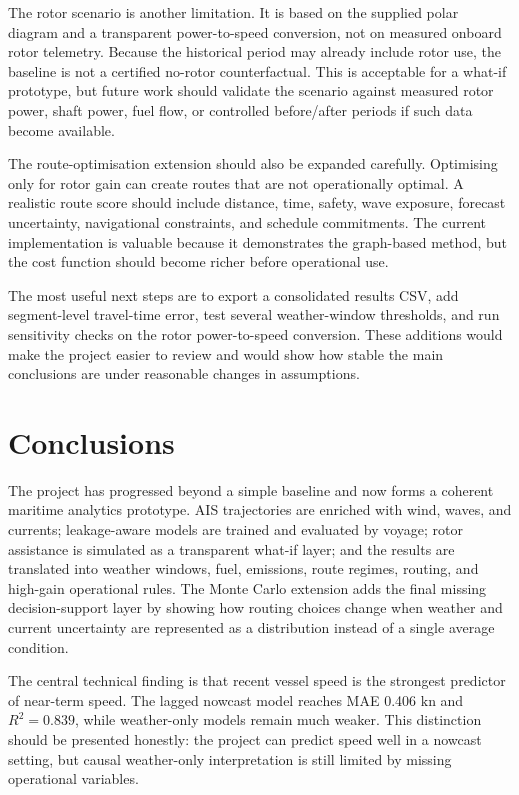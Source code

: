 \documentclass[10pt,a4paper]{article}
\newcommand{\kn}{\ensuremath{\mathrm{kn}}}
\begin{document}
The rotor scenario is another limitation. It is based on the supplied polar
diagram and a transparent power-to-speed conversion, not on measured onboard
rotor telemetry. Because the historical period may already include rotor use,
the baseline is not a certified no-rotor counterfactual. This is acceptable for
a what-if prototype, but future work should validate the scenario against
measured rotor power, shaft power, fuel flow, or controlled before/after periods
if such data become available.

The route-optimisation extension should also be expanded carefully. Optimising
only for rotor gain can create routes that are not operationally optimal. A
realistic route score should include distance, time, safety, wave exposure,
forecast uncertainty, navigational constraints, and schedule commitments. The
current implementation is valuable because it demonstrates the graph-based
method, but the cost function should become richer before operational use.

The most useful next steps are to export a consolidated results CSV, add
segment-level travel-time error, test several weather-window thresholds, and run
sensitivity checks on the rotor power-to-speed conversion. These additions would
make the project easier to review and would show how stable the main conclusions
are under reasonable changes in assumptions.



\section{Conclusions}

The project has progressed beyond a simple baseline and now forms a coherent
maritime analytics prototype. AIS trajectories are enriched with wind, waves,
and currents; leakage-aware models are trained and evaluated by voyage; rotor
assistance is simulated as a transparent what-if layer; and the results are
translated into weather windows, fuel, emissions, route regimes, routing, and
high-gain operational rules. The Monte Carlo extension adds the final missing
decision-support layer by showing how routing choices change when weather and
current uncertainty are represented as a distribution instead of a single
average condition.

The central technical finding is that recent vessel speed is the strongest
predictor of near-term speed. The lagged nowcast model reaches MAE 0.406 \kn{}
and $R^2=0.839$, while weather-only models remain much weaker. This distinction
should be presented honestly: the project can predict speed well in a nowcast
setting, but causal weather-only interpretation is still limited by missing
operational variables.
\end{document}
